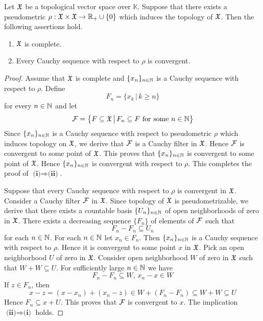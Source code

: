 \begin{theorem}\label{theorem:pseudometrizability_completeness_is_determined_by_Cauchy_sequences}
Let ${\mathfrak X}$ be a topological vector space over $\mathbb{K}$. Suppose that there exists a pseudometric $\rho:{\mathfrak X}\times {\mathfrak X} \rightarrow {\mathbb R}_+\cup \{0\}$ which induces the topology of ${\mathfrak X}$. Then the following assertions hold.
\begin{enumerate}[label=\emph{\textbf{(\roman*)}}, leftmargin=*]
\item ${\mathfrak X}$ is complete.
\item Every Cauchy sequence with respect to $\rho$ is convergent.
\end{enumerate}
\end{theorem}
\begin{proof}
Assume that ${\mathfrak X}$ is complete and $\{x_n\}_{n\in {\mathbb N}}$ is a Cauchy sequence with respect to $\rho$. Define
$$F_n = \big\{x_k\,\big|\,k\geq n\big\}$$
for every $n\in {\mathbb N}$ and let 
$${\mathcal F} = \big\{F\subseteq {\mathfrak X}\,\big|\,F_n \subseteq F\mbox{ for some }n\in {\mathbb N}\big\}$$
Since $\{x_n\}_{n\in {\mathbb N}}$ is a Cauchy sequence with respect to pseudometric $\rho$ which induces topology on ${\mathfrak X}$, we derive that ${\mathcal F}$ is a Cauchy filter in ${\mathfrak X}$. Hence ${\mathcal F}$ is convergent to some point of ${\mathfrak X}$. This proves that $\{x_n\}_{n\in {\mathbb N}}$ is convergent to some point of ${\mathfrak X}$. Hence $\{x_n\}_{n\in {\mathbb N}}$ is convergent with respect to $\rho$. This completes the proof of $\textbf{(i)}\Rightarrow \textbf{(ii)}$.

Suppose that every Cauchy sequence with respect to $\rho$ is convergent in ${\mathfrak X}$. Consider a Cauchy filter ${\mathcal F}$ in ${\mathfrak X}$. Since topology of ${\mathfrak X}$ is pseudometrizable, we derive that there exists a countable basis $\{U_n\}_{n\in {\mathbb N}}$ of open neighborhoods of zero in ${\mathfrak X}$. There exists a decreasing sequence $\{F_n\}$ of elements of ${\mathcal F}$ such that
$$F_n - F_n\subseteq U_n$$
for each $n\in {\mathbb N}$. For each $n\in {\mathbb N}$ let $x_n \in F_n$. Then $\{x_n\}_{n\in {\mathbb N}}$ is a Cauchy sequence with respect to $\rho$. Hence it is convergent to some point $x$ in ${\mathfrak X}$. Pick an open neighborhood $U$ of zero in ${\mathfrak X}$. Consider open neighborhood $W$ of zero in ${\mathfrak X}$ such that $W + W \subseteq U$. For sufficiently large $n\in {\mathbb N}$ we have 
$$F_n - F_n \subseteq W,\,x_n - x \in W$$
If $z \in F_n$, then
$$x - z = (x - x_n) + (x_n - z) \in W + (F_n - F_n) \subseteq W + W \subseteq U$$
Hence $F_n \subseteq x + U$. This proves that ${\mathcal F}$ is convergent to $x$. The implication $\textbf{(ii)}\Rightarrow \textbf{(i)}$ holds.  
\end{proof}

